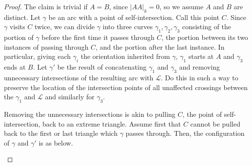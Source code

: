 \documentclass[12pt, letterpaper,table]{amsart}
\theoremstyle{remark}
\begin{document}
\begin{proof}
The claim is trivial if $A = B$, since $\vert AA \vert_k = 0$, so we assume $A$ and $B$ are distinct. Let $\gamma$ be an arc with a point of self-intersection. Call this point $C$. Since $\gamma$ visits $C$ twice, we can divide $\gamma$ into three curves $\gamma_1,\gamma_2,\gamma_3$ consisting of the portion of $\gamma$ before the first time it passes through $C$, the portion between its two instances of passing through $C$, and the portion after the last instance.  In particular, giving each $\gamma_i$ the orientation inherited from $\gamma$, $\gamma_1$ starts at $A$ and $\gamma_3$ ends at $B$.  Let $\gamma'$ be the result of concatenating $\gamma_1$ and $\gamma_3$ and removing unnecessary intersections of the resulting arc with $\mathcal{L}$. Do this in such a way to preserve the location of the intersection points of all unaffected crossings between the $\gamma_1$ and $\mathcal{L}$ and similarly for $\gamma_3$. 

Removing the unnecessary intersections is akin to pulling $C$, the point of self-intersection, back to an extreme triangle. Assume first that $C$ cannot be pulled back to the first or last triangle which $\gamma$ passes through. Then, the configuration of $\gamma$ and $\gamma'$ is as below. 

\begin{center}
\end{center}



\end{proof}
\end{document}
